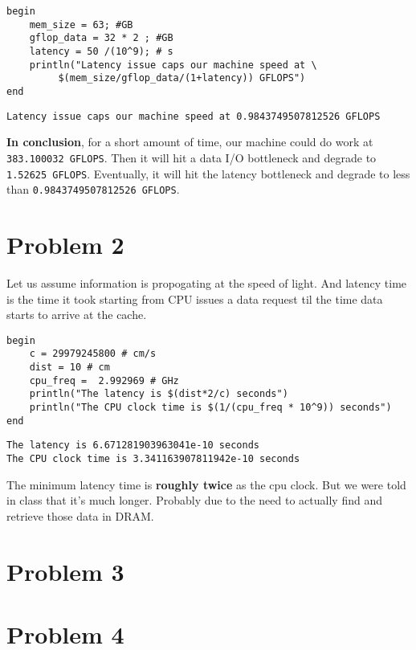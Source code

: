 \documentclass[11pt]{article}
\begin{document}
\begin{verbatim}
begin
    mem_size = 63; #GB
    gflop_data = 32 * 2 ; #GB
    latency = 50 /(10^9); # s
    println("Latency issue caps our machine speed at \
         $(mem_size/gflop_data/(1+latency)) GFLOPS")
end
\end{verbatim}

\begin{verbatim}
Latency issue caps our machine speed at 0.9843749507812526 GFLOPS
\end{verbatim}



\textbf{In conclusion}, for a short amount of time, our machine could do work at
\texttt{383.100032 GFLOPS}. Then it will hit a data I/O bottleneck and degrade to
\texttt{1.52625 GFLOPS}. Eventually, it will hit the latency bottleneck and degrade to
less than \texttt{0.9843749507812526 GFLOPS}.

\section{Problem 2}
\label{sec:org1c6248b}
Let us assume information is propogating at the speed of light. And latency time
is the time it took starting from CPU issues a data request til the time data
starts to arrive at the cache.

\begin{verbatim}
begin
    c = 29979245800 # cm/s
    dist = 10 # cm
    cpu_freq =  2.992969 # GHz
    println("The latency is $(dist*2/c) seconds")
    println("The CPU clock time is $(1/(cpu_freq * 10^9)) seconds")
end
\end{verbatim}

\begin{verbatim}
The latency is 6.671281903963041e-10 seconds
The CPU clock time is 3.341163907811942e-10 seconds
\end{verbatim}


The minimum latency time is \textbf{roughly twice} as the cpu clock. But we were told
in class that it's much longer. Probably due to the need to actually find and
retrieve those data in DRAM.

\section{Problem 3}
\label{sec:orgce55d6f}

\section{Problem 4}
\label{sec:orgb4acbd6}
\end{document}
